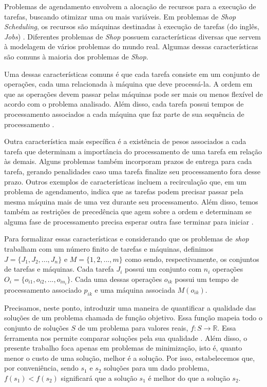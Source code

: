 Problemas de agendamento envolvem a alocação de recursos para a execução de tarefas, buscando otimizar uma ou mais variáveis. Em problemas de \textit{Shop Scheduling}, os recursos são máquinas destinadas à execução de tarefas (do inglês, \textit{Jobs}) \citep{pinedo2008}. Diferentes problemas de \textit{Shop} possuem características diversas que servem à modelagem de vários problemas do mundo real. Algumas dessas características são comuns à maioria dos problemas de \textit{Shop}.

Uma dessas características comuns é que cada tarefa consiste em um conjunto de operações, cada uma relacionada à máquina que deve processá-la. A ordem em que as operações devem passar pelas máquinas pode ser mais ou menos flexível de acordo com o problema analisado. Além disso, cada tarefa possui tempos de processamento associados a cada máquina que faz parte de sua sequência de processamento \citep{pinedo2008}.

Outra característica mais específica é a existência de pesos associados a cada tarefa que determinam a importância do processamento de uma tarefa em relação às demais. Alguns problemas também incorporam prazos de entrega para cada tarefa, gerando penalidades caso uma tarefa finalize seu processamento fora desse prazo. Outros exemplos de características incluem a recirculação que, em um problema de agendamento, indica que as tarefas podem precisar passar pela mesma máquina mais de uma vez durante seu processamento. Além disso, temos também as restrições de precedência que agem sobre a ordem e determinam se alguma fase de processamento precisa esperar outra fase terminar para iniciar \citep{pinedo2008}.

Para formalizar essas características e considerando que os problemas de \textit{shop} trabalham com um número finito de tarefas e máquinas, definimos $J = \{J_1, J_2, ..., J_n\}$ e $M = \{1, 2, ..., m\}$ como sendo, respectivamente, os conjuntos de tarefas e máquinas. Cada tarefa $J_i$ possui um conjunto com $n_i$ operações $O_i = \{o_{i1}, o_{i2}, ..., o_{in_i}\}$. Cada uma dessas operações $o_{ik}$ possui um tempo de processamento associado $p_{ik}$ e uma máquina associada $M(o_{ik})$.

Precisamos, neste ponto, introduzir uma maneira de quantificar a qualidade das soluções de um problema chamada de função objetivo. Essa função mapeia todo o conjunto de soluções $S$ de um problema para valores reais, $f : S \to \mathbb{R}$. Essa ferramenta nos permite comparar soluções pela sua qualidade \citep{talbi}. Além disso, o presente trabalho foca apenas em problemas de minimização, isto é, quanto menor o custo de uma solução, melhor é a solução. Por isso, estabelecemos que, por conveniência, sendo $s_1$ e $s_2$ soluções para um dado problema, $f(s_1) < f(s_2)$ significará que a solução $s_1$ é melhor do que a solução $s_2$.

